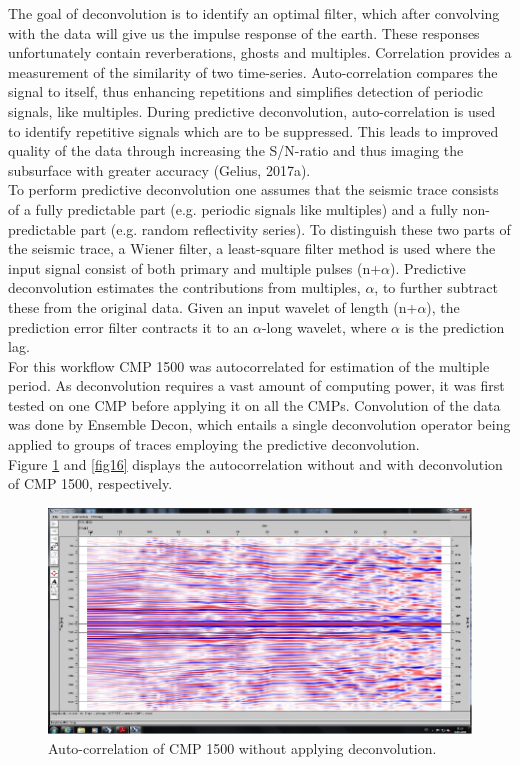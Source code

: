 \documentclass[10pt,a4paper]{article}
\begin{document}
\noindent The goal of deconvolution is to identify an optimal filter, which after convolving with the data will give us the impulse response of the earth. These responses unfortunately contain reverberations, ghosts and multiples. Correlation provides a measurement of the similarity of two time-series. Auto-correlation compares the signal to itself, thus enhancing repetitions and simplifies detection of periodic signals, like multiples. During predictive deconvolution, auto-correlation is used to identify repetitive signals which are to be suppressed. This leads to improved quality of the data through increasing the S/N-ratio and thus imaging the subsurface with greater accuracy (Gelius, 2017a). 
\\
To perform predictive deconvolution one assumes that the seismic trace consists of a fully predictable part (e.g. periodic signals like multiples) and a fully non-predictable part (e.g. random reflectivity series). To distinguish these two parts of the seismic trace, a Wiener filter, a least-square filter method is used where the input signal consist of both primary and multiple pulses (n+$\alpha$). Predictive deconvolution estimates the contributions from multiples, $\alpha$, to further subtract these from the original data. Given an input wavelet of length (n+$\alpha$), the prediction error filter contracts it to an $\alpha$-long wavelet, where $\alpha$ is the prediction lag. 
\\
For this workflow CMP 1500 was autocorrelated for estimation of the multiple period. As deconvolution requires a vast amount of computing power, it was first tested on one CMP before applying it on all the CMPs. Convolution of the data was done by Ensemble Decon, which entails a single deconvolution operator being applied to groups of traces employing the predictive deconvolution.
\\
Figure \ref{fig15} and \ref{fig16} displays the autocorrelation without and with deconvolution of CMP 1500, respectively.


\begin{figure}[H]
\centering
\includegraphics[width=\textwidth, trim={0.4cm 0.8cm 0cm 0.5cm},clip]{fig15.jpg}
\caption{Auto-correlation of CMP 1500 without applying deconvolution.}
\label{fig15}
\end{figure}
\end{document}
